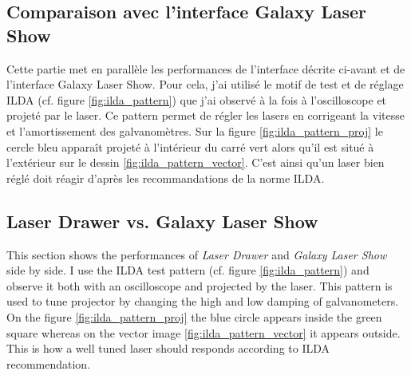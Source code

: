 \clearpage

\begin{fr}
\subsection{Comparaison avec l'interface Galaxy Laser Show}

Cette partie met en parallèle les performances de l'interface décrite ci-avant et de l'interface Galaxy Laser Show.
Pour cela, j'ai utilisé le motif de test et de réglage ILDA (cf. figure \ref{fig:ilda_pattern}) que j'ai observé à la fois à l'oscilloscope et projeté par le laser.
Ce pattern permet de régler les lasers en corrigeant la vitesse et l'amortissement des galvanomètres.
Sur la figure \ref{fig:ilda_pattern_proj} le cercle bleu apparaît projeté à l'intérieur du carré vert alors qu'il est situé à l'extérieur sur le dessin \ref{fig:ilda_pattern_vector}.
C'est ainsi qu'un laser bien réglé doit réagir d'après les recommandations de la norme ILDA.
\end{fr}

\begin{en}
\subsection{Laser Drawer vs. Galaxy Laser Show}

This section shows the performances of \textit{Laser Drawer} and \textit{Galaxy Laser Show} side by side.
I use the ILDA test pattern (cf. figure \ref{fig:ilda_pattern}) and observe it both with an oscilloscope and projected by the laser.
This pattern is used to tune projector by changing the high and low damping of galvanometers.
On the figure \ref{fig:ilda_pattern_proj} the blue circle appears inside the green square whereas on the vector image \ref{fig:ilda_pattern_vector} it appears outside.
This is how a well tuned laser should responds according to ILDA recommendation.
\end{en}

